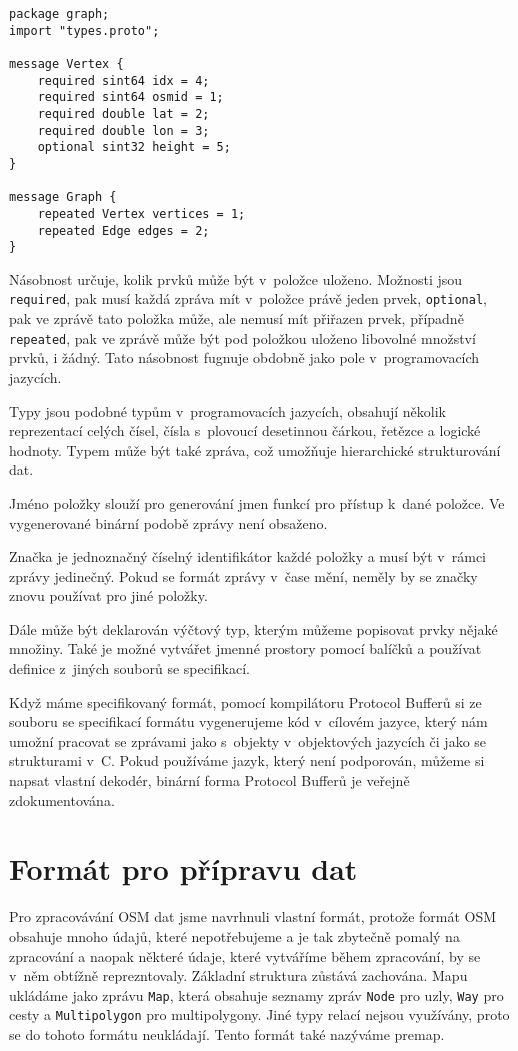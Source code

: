 \begin{verbatim}
package graph;
import "types.proto";

message Vertex {
    required sint64 idx = 4;
    required sint64 osmid = 1;
    required double lat = 2;
    required double lon = 3;
    optional sint32 height = 5;
}

message Graph {
    repeated Vertex vertices = 1;
    repeated Edge edges = 2;
}
\end{verbatim}

{\tuc Násobnost} určuje, kolik prvků může být v~položce uloženo. Možnosti jsou
\verb|required|, pak musí každá zpráva mít v~položce právě jeden prvek,
\verb|optional|, pak ve zprávě tato položka může, ale nemusí mít přiřazen prvek,
případně \verb|repeated|, pak ve zprávě může být pod položkou uloženo libovolné
množství prvků, i žádný. Tato násobnost fugnuje obdobně jako pole
v~programovacích jazycích. 

\smallskip
{\tuc Typy} jsou podobné typům v~programovacích jazycích, obsahují několik
reprezentací celých čísel, čísla s~plovoucí desetinnou čárkou, řetězce a logické
hodnoty. Typem může být také zpráva, což umožňuje hierarchické strukturování
dat. 

\smallskip
{\tuc Jméno} položky slouží pro generování jmen funkcí pro přístup k~dané
položce. Ve vygenerované binární podobě zprávy není obsaženo. 

\smallskip
{\tuc Značka} je jednoznačný číselný identifikátor každé položky a musí být v~rámci
zprávy jedinečný. Pokud se formát zprávy v~čase mění, neměly by se značky znovu
používat pro jiné položky.

Dále může být deklarován výčtový typ, kterým můžeme popisovat prvky nějaké
množiny. Také je možné vytvářet jmenné prostory pomocí balíčků a používat
definice z~jiných souborů se specifikací.

Když máme specifikovaný formát, pomocí kompilátoru Protocol Bufferů si ze
souboru se specifikací formátu vygenerujeme kód v~cílovém jazyce, který nám
umožní pracovat se zprávami jako s~objekty v~objektových jazycích či jako se
strukturami v~C. Pokud používáme jazyk, který není podporován, můžeme si napsat
vlastní dekodér, binární forma Protocol Bufferů je veřejně
zdokumentována.\cite{pbfenc}

\section{Formát pro přípravu dat}
Pro zpracovávání OSM dat jsme navrhnuli vlastní formát, protože formát OSM
obsahuje mnoho údajů, které nepotřebujeme a je tak zbytečně pomalý na zpracování
a naopak některé údaje, které vytváříme během zpracování, by se v~něm obtížně
reprezntovaly. Základní struktura zůstává zachována. Mapu ukládáme jako zprávu
\verb|Map|, která obsahuje seznamy zpráv \verb|Node| pro uzly, \verb|Way| pro
cesty a \verb|Multipolygon| pro multipolygony. Jiné typy relací nejsou
využívány, proto se do tohoto formátu neukládají. Tento formát také nazýváme
premap\label{label:premap}.

